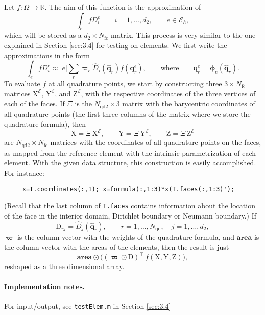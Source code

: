 \documentclass[10pt,english]{article}
\newcommand{\Nnd}{{N_{\mathrm{qd}}}}
\newcommand{\Nndb}{{N_{\mathrm{qd2}}}}
\newcommand{\Nfc}{{N_{\mathrm{fc}}}}
\newcommand{\qq}{\widehat{\mathbf q}}
\begin{document}
Let $f:\Omega\to\mathbb R$. The aim of this function is the approximation of
\[
\int_e f D_i^e \qquad i=1,\ldots,d_2, \qquad e \in \mathcal E_h, 
\]
which will be stored as a $d_2\times \Nfc$ matrix. This process is very similar to the one explained in Section \ref{sec:3.4} for testing on elements. We first write the approximations in the form
\[
\int_e f D_i^e \approx |e|\sum_r  \varpi_r \widehat D_i(\qq_r) f(\mathbf q_r^e),\qquad\mbox{where}\qquad \mathbf q_r^e=\boldsymbol\phi_e(\qq_r).
\]
To evaluate $f$ at all quadrature points, we start by constructing three $3\times \Nfc$ matrices $\mathrm X^{\mathcal E}$, 
$\mathrm Y^{\mathcal E}$,  and $\mathrm Z^{\mathcal E}$, with the respective coordinates of the three vertices of each of the faces. If $\Xi$ is the $\Nndb\times 3$ matrix with the barycentric coordinates of all quadrature points (the first three columns of the matrix where we store the quadrature formula), then
\[
\mathrm X =\Xi \,\mathrm X^{\mathcal E}, \qquad
\mathrm Y =\Xi\,\mathrm Y^{\mathcal E},\qquad
\mathrm Z =\Xi\,\mathrm Z^{\mathcal E}
\]
are $\Nndb\times \Nfc$ matrices with the coordinates of all quadrature points on the faces, as mapped from the reference element with the intrinsic parametrization of each element. With the given data structure, this construction is easily accomplished. For instance:

\begin{verbatim}
     x=T.coordinates(:,1); x=formula(:,1:3)*x(T.faces(:,1:3)');
\end{verbatim}

(Recall that the last column of {\tt T.faces} contains information about the location of the face in the interior domain, Dirichlet boundary or Neumann boundary.)
If
\[
\mathrm D_{rj}=\widehat D_j(\qq_r), \qquad  r=1,\ldots,\Nnd,\quad j=1,\ldots,d_2,  
\]
$\boldsymbol\varpi$ is the column vector with the weights of the quadrature formula, and $\mathbf{area}$ is the column vector with the areas of the elements, then the result is just
\[
\mathbf{area}\odot \Big((\boldsymbol\varpi\odot\mathrm D)^\top \, f(\mathrm X,\mathrm Y,\mathrm Z)\Big),
\]
reshaped as a three dimensional array.


\paragraph{Implementation notes.}
For input/output, see {\tt testElem.m} in Section \ref{sec:3.4}



\end{document}
